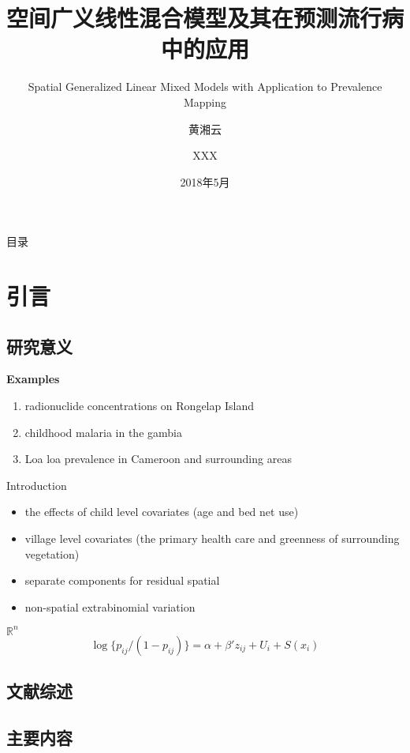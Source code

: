 \documentclass[11pt,compress,xcolor=x11names,UTF8]{ctexbeamer}
\title{空间广义线性混合模型及其在预测流行病中的应用}
\subtitle{Spatial Generalized Linear Mixed Models with Application to Prevalence Mapping}
\author{黄湘云\and XXX}
\institute[CUMTB]{理学院\\ 中国矿业大学（北京）}
\date{2018年5月}
\begin{document}
\frame{\maketitle}

\begin{frame}{目录}
  \tableofcontents  
\end{frame}


\section{引言}


\subsection{研究意义}

\begin{frame}
\textbf{Examples}

\begin{enumerate}
\item radionuclide concentrations on Rongelap Island
\item childhood malaria in the gambia
\item Loa loa prevalence in Cameroon and surrounding areas
\end{enumerate}

\end{frame}

\begin{frame}{Introduction}

\citet{Diggle2002}
\begin{itemize}
\item the effects of child level covariates (age and bed net use)
\item village level covariates (the primary health care and greenness of surrounding vegetation)
\item separate components for residual spatial
\item non-spatial extrabinomial variation
\end{itemize}
$\mathbb{R}^{n}$
$$\log \{p_{ij}/(1-p_{ij})\} =\alpha + \beta'z_{ij} + U_{i} + S(x_{i})$$

\end{frame}

\subsection{文献综述}

\subsection{主要内容}
\end{document}
